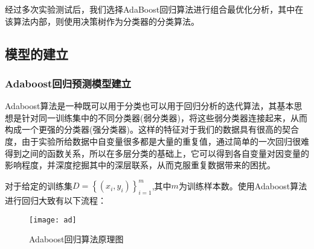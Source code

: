 \documentclass[withoutpreface,bwprint]{cumcmthesis} %
\begin{document}
经过多次实验测试后，我们选择AdaBoost回归算法进行组合最优化分析，其中在该算法内部，则使用决策树作为分类器的分类算法。

\subsection{模型的建立}
\subsubsection{Adaboost回归预测模型建立}
Adaboost算法是一种既可以用于分类也可以用于回归分析的迭代算法，其基本思想是针对同一训练集中的不同分类器(弱分类器)，将这些弱分类器连接起来，从而构成一个更强的分类器(强分类器)。这样的特征对于我们的数据具有很高的契合度，由于实验所给数据中自变量很多都是大量的重复值，通过简单的一次回归很难得到之间的函数关系，所以在多层分类的基础上，它可以得到各自变量对因变量的影响程度，并深度挖掘其中的深层联系，从而克服重复数据带来的困扰。

对于给定的训练集$D=\left\{\left(x_{i},y_{i}\right)\right\}_{i=1}^{m}$,其中$m$为训练样本数。使用Adaboost算法进行回归大致有以下流程：
\begin{figure}[!h]
	\centering
	\texttt{[image: ad]}
	\caption{Adaboost回归算法原理图}
	\label{fig:circuit-diagram}
\end{figure}
\end{document}
